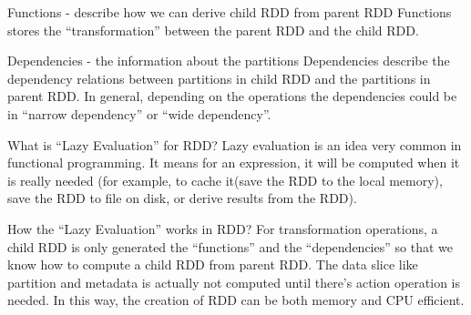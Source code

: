 \documentclass[notheorems, aspectratio=54]{beamer}
\begin{document}

\begin{frame}

\begin{block}{Functions - describe how we can derive child RDD from parent RDD}
 Functions stores the ``transformation'' between the parent RDD and the child RDD. 
\end{block}

\begin{block}{Dependencies - the information about the partitions}
 Dependencies describe the dependency relations between partitions in child RDD and the partitions in parent RDD. In general, depending on the operations the dependencies could be in ``narrow dependency'' or ``wide dependency''.
\end{block}

\end{frame}


\begin{frame}

\begin{block}{What is ``Lazy Evaluation'' for RDD?}
 Lazy evaluation is an idea very common in functional programming. It means for an expression, it will be computed when it is really needed (for example, to cache it(save the RDD to the local memory), save the RDD to file on disk, or derive results from the RDD). 
\end{block}

\begin{block}{How the ``Lazy Evaluation'' works in RDD?}
For transformation operations, a child RDD is only generated the ``functions'' and the ``dependencies'' so that we know how to compute a child RDD from parent RDD. 
The data slice like partition and metadata is actually not computed until there's 
action operation is needed. In this way, the creation of RDD can be both memory and  CPU efficient.
\end{block}


\end{frame}

\end{document}

